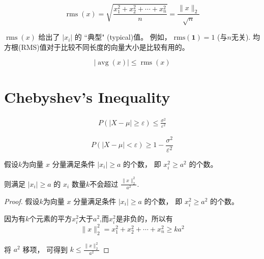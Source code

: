 \begin{definition}
    \begin{equation} \operatorname{rms}(x)=\sqrt{\frac{x_{1}^{2}+x_{2}^{2}+\cdots+x_{n}^{2}}{n}}=\frac{\|x\|_{2}}{\sqrt{n}} \end{equation}
\end{definition}

$ \operatorname{rms}(x) $ 给出了 $ \left|x_{i}\right| $ 的 “典型" (typical)值。 例如， $ \mathrm{rms}(\mathbf{1})=1 $ (与$n$无关). 均方根(RMS)值对于比较不同长度的向量大小是比较有用的。 

\begin{theorem}
    \begin{equation} |\operatorname{avg}(x)| \leq \operatorname{r m s}(x) \end{equation}
\end{theorem}

\section{Chebyshev's Inequality}

\begin{theorem}
\begin{equation}
\begin{aligned}
    P(|X-\mu| \ge \varepsilon) \le \frac{\sigma^2}{\varepsilon^2}
\end{aligned}
\end{equation}

\begin{equation}
 P(|X-\mu| < \varepsilon) \ge 1 - \frac{\sigma^2}{\varepsilon^2}
\end{equation}
\end{theorem}

    

   
\begin{theorem}
    假设$k$为向量 $ x $ 分量满足条件 $ \left|x_{i}\right| \geq a $ 的个数， 即 $ x_{i}^{2} \geq a^{2} $ 的个数。 

    则满足 $ \left|x_{i}\right| \geq a $ 的 $ x_{i} $ 数量$k$不会超过 $ \frac{\| x \|_{2}^{2}}{a^{2}} $.
\end{theorem}

\begin{proof}
    假设$k$为向量 $ x $ 分量满足条件 $ \left|x_{i}\right| \geq a $ 的个数， 即 $ x_{i}^{2} \geq a^{2} $ 的个数。
    
    因为有$k$个元素的平方$x_i^2$大于$a^{2}$,而$x_i^2$是非负的，所以有
    \begin{equation} \|x\|_{2}^{2}=x_{1}^{2}+x_{2}^{2}+\cdots+x_{n}^{2} \geq k a^{2} \end{equation}

    将 $ a^{2} $ 移项， 可得到 $ k \leq \frac{\|x\|_{2}^{2}}{a^{2}} $
\end{proof}

